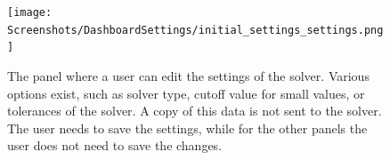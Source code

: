\begin{figure}
    \centering
    \texttt{[image: Screenshots/DashboardSettings/initial\_settings\_settings.png]}
    \caption{
        The panel where a user can edit the settings of the solver. 
        Various options exist, such as solver type, cutoff value for small values, or tolerances of the solver. 
        A copy of this data is not sent to the solver. 
        The user needs to save the settings, while for the other panels the user does not need to save the changes. 
    }
    \label{fig:ss:ds:settings}
\end{figure}

